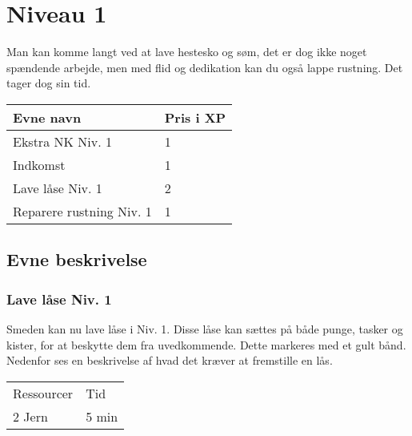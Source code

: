 \chapter{Niveau 1}
Man kan komme langt ved at lave hestesko og søm, det er dog ikke noget spændende arbejde, men med flid og dedikation kan du også lappe rustning. Det tager dog sin tid.
\begin{table}[H]
    \centering
    \begin{tabular}{|p{}|p{}|}
    \rowcolor{cerulean!80}\hline
        Evne navn & Pris i XP \\\hline
         Ekstra NK Niv. 1 & 1 \\\hline
         Indkomst & 1\\\hline
         Lave låse Niv. 1 & 2\\\hline
         Reparere rustning Niv. 1 & 1\\\hline
    \end{tabular}
\end{table}

\section{Evne beskrivelse}





\subsection{Lave låse Niv. 1}
Smeden kan nu lave låse i Niv. 1. Disse låse kan sættes på både punge, tasker og kister, for at beskytte dem fra uvedkommende. Dette markeres med et gult bånd.
Nedenfor ses en beskrivelse af hvad det kræver at fremstille en lås.\\

\begin{table}[H]
    \centering
    \begin{tabular}{|p{}|p{}|}
    \hline
    \rowcolor{cerulean!80}
    \multicolumn{2}{c}{Lås Niv. 1}\\
    \hline
    \rowcolor{cerulean!40}
         Ressourcer & Tid \\\hline
         2 Jern & 5 min\\\hline
    \end{tabular}
    \end{table}

